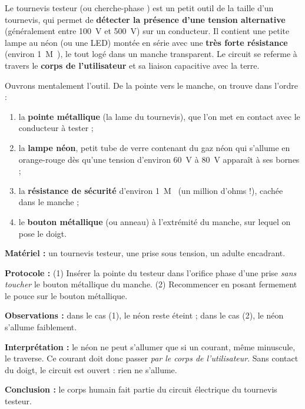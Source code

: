 \documentclass[11pt]{article}
\newcommand{\cle}[1]{{\popxbold\color{popdark}#1}}
\begin{document}
\begin{definition}
Le \cle{tournevis testeur} (ou \og cherche-phase \fg{}) est un petit outil de la taille d'un tournevis, qui permet de \textbf{détecter la présence d'une tension alternative} (généralement entre \SI{100}{V} et \SI{500}{V}) sur un conducteur. Il contient une petite lampe au \cle{néon} (ou une LED) montée en série avec une \textbf{très forte résistance} (environ \SI{1}{M\Omega}), le tout logé dans un manche transparent. Le circuit se referme à travers le \textbf{corps de l'utilisateur} et sa liaison capacitive avec la terre.
\end{definition}

Ouvrons mentalement l'outil. De la pointe vers le manche, on trouve dans l'ordre :
\begin{enumerate}
\item la \textbf{pointe métallique} (la lame du tournevis), que l'on met en contact avec le conducteur à tester ;
\item la \textbf{lampe néon}, petit tube de verre contenant du gaz néon qui s'allume en orange-rouge dès qu'une tension d'environ \SI{60}{V} à \SI{80}{V} apparaît à ses bornes ;
\item la \textbf{résistance de sécurité} d'environ \SI{1}{M\Omega} (un million d'ohms !), cachée dans le manche ;
\item le \textbf{bouton métallique} (ou anneau) à l'extrémité du manche, sur lequel on pose le doigt.
\end{enumerate}

\begin{experience}
\textbf{Matériel :} un tournevis testeur, une prise sous tension, un adulte encadrant.\par
\textbf{Protocole :} (1) Insérer la pointe du testeur dans l'orifice phase d'une prise \emph{sans toucher} le bouton métallique du manche. (2) Recommencer en posant fermement le pouce sur le bouton métallique.\par
\textbf{Observations :} dans le cas (1), le néon reste éteint ; dans le cas (2), le néon s'allume faiblement.\par
\textbf{Interprétation :} le néon ne peut s'allumer que si un courant, même minuscule, le traverse. Ce courant doit donc passer \emph{par le corps de l'utilisateur}. Sans contact du doigt, le circuit est ouvert : rien ne s'allume.\par
\textbf{Conclusion :} le corps humain fait partie du circuit électrique du tournevis testeur.
\end{experience}
\end{document}
